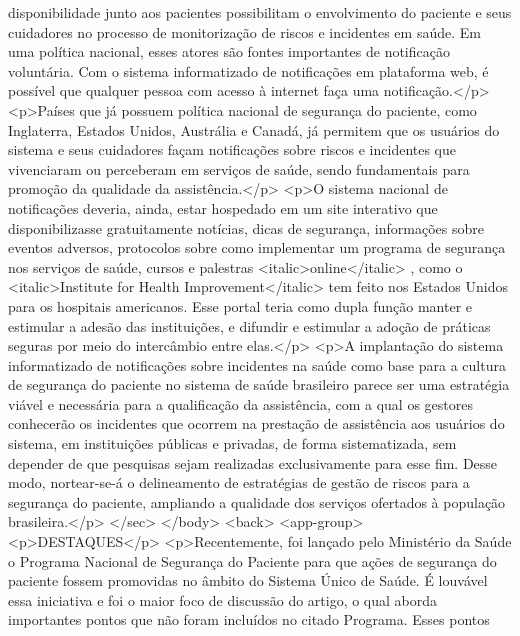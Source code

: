         disponibilidade junto aos pacientes possibilitam o envolvimento do paciente e seus
        cuidadores no processo de monitorização de riscos e incidentes em saúde. Em uma política
        nacional, esses atores são fontes importantes de notificação voluntária. Com o sistema
        informatizado de notificações em plataforma web, é possível que qualquer pessoa com acesso à
        internet faça uma notificação.</p>
      <p>Países que já possuem política nacional de segurança do paciente, como Inglaterra, Estados
        Unidos, Austrália e Canadá, já permitem que os usuários do sistema e seus cuidadores façam
        notificações sobre riscos e incidentes que vivenciaram ou perceberam em serviços de saúde,
        sendo fundamentais para promoção da qualidade da assistência.</p>
      <p>O sistema nacional de notificações deveria, ainda, estar hospedado em um site interativo
        que disponibilizasse gratuitamente notícias, dicas de segurança, informações sobre eventos
        adversos, protocolos sobre como implementar um programa de segurança nos serviços de saúde,
        cursos e palestras <italic>online</italic> , como o <italic>Institute for Health
          Improvement</italic> tem feito nos Estados Unidos para os hospitais americanos. Esse
        portal teria como dupla função manter e estimular a adesão das instituições, e difundir e
        estimular a adoção de práticas seguras por meio do intercâmbio entre elas.</p>
      <p>A implantação do sistema informatizado de notificações sobre incidentes na saúde como base
        para a cultura de segurança do paciente no sistema de saúde brasileiro parece ser uma
        estratégia viável e necessária para a qualificação da assistência, com a qual os gestores
        conhecerão os incidentes que ocorrem na prestação de assistência aos usuários do sistema, em
        instituições públicas e privadas, de forma sistematizada, sem depender de que pesquisas
        sejam realizadas exclusivamente para esse fim. Desse modo, nortear-se-á o delineamento de
        estratégias de gestão de riscos para a segurança do paciente, ampliando a qualidade dos
        serviços ofertados à população brasileira.</p>
    </sec>
  </body>
  <back>
    <app-group>
      <p>DESTAQUES</p>
      <p>Recentemente, foi lançado pelo Ministério da Saúde o Programa Nacional de Segurança do
        Paciente para que ações de segurança do paciente fossem promovidas no âmbito do Sistema
        Único de Saúde. É louvável essa iniciativa e foi o maior foco de discussão do artigo, o qual
        aborda importantes pontos que não foram incluídos no citado Programa. Esses pontos
